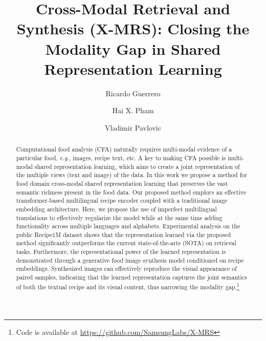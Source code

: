 \documentclass[sigconf,nonacm]{acmart}
\def\eg{\emph{e.g.}} \def\Eg{\emph{E.g.}}
\begin{document}
\fancyhead{}

\title{Cross-Modal Retrieval and Synthesis (X-MRS): Closing the Modality Gap in Shared Representation Learning 
}


\author{Ricardo Guerrero}

\author{Hai X. Pham}

\author{Vladimir Pavlovic}











\begin{abstract}
   Computational food analysis (CFA) naturally requires multi-modal evidence of a particular food, \eg, images, recipe text, etc. A key to making CFA possible is multi-modal shared representation learning, which aims to create a joint representation of the multiple views (text and image) of the data. In this work we propose a method for food domain cross-modal shared representation learning that preserves the vast semantic richness present in the food data. Our proposed method employs an effective transformer-based multilingual recipe encoder coupled with a traditional image embedding architecture. Here, we propose the use of imperfect multilingual translations to effectively regularize the model while at the same time adding functionality across multiple languages and alphabets. Experimental analysis on the public Recipe1M dataset shows that the representation learned via the proposed method significantly outperforms the current state-of-the-arts (SOTA) on retrieval tasks. Furthermore, the representational power of the learned representation is demonstrated through a generative food image synthesis model conditioned on recipe embeddings. Synthesized images can effectively reproduce the visual appearance of paired samples, indicating that the learned representation captures  the joint semantics of both the textual recipe and its visual content, thus narrowing the modality gap.\footnote{Code is available at \href{https://github.com/SamsungLabs/X-MRS}{https://github.com/SamsungLabs/X-MRS}}
\end{abstract}
\end{document}
